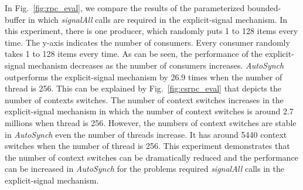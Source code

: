 \documentclass[preprint]{sigplanconf}
\begin{document}
In Fig.~\ref{fig:rpc_eval}, we compare the results of the parameterized 
bounded-buffer in which {\em signalAll} calls are required in the 
explicit-signal mechanism. In this experiment, there is one producer, which
randomly puts 1 to 128 items every time. The y-axis indicates the number of 
consumers. Every consumer randomly takes 1 to 128 items every time. As can be
seen, the performance of the explicit-signal mechanism decreases as the number
of consumers increases. {\em AutoSynch} outperforms the explicit-signal 
mechanism by 26.9 times when the number of thread is 256. This can be explained 
by Fig.~\ref{fig:csrpc_eval} that depicts the number of contexts switches. The
number of context switches increases in the explicit-signal
mechanism in which the number of context switches is around 2.7 millions when 
thread is 256. However, the numbers of context switches are stable in {\em
AutoSynch} even the number of threads increase. It has around 5440 context
switches when the number of thread is 256. This experiment demonstrates
that the number of context switches can be dramatically reduced and the
performance can be increased in {\em AutoSynch} for the problems required 
{\em signalAll} calls in the explicit-signal mechanism. 
\end{document}
